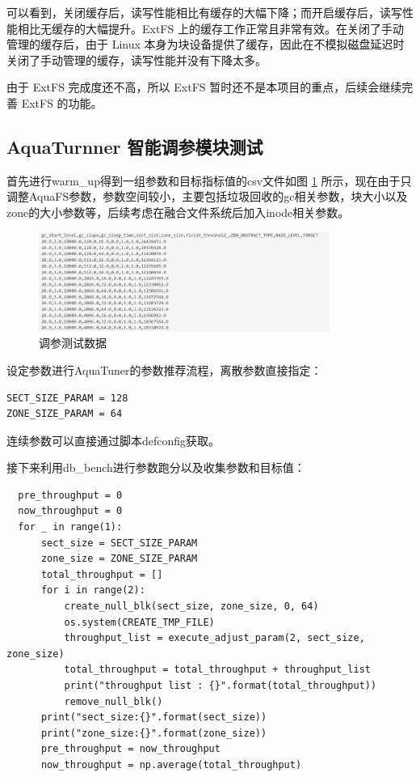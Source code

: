 可以看到，关闭缓存后，读写性能相比有缓存的大幅下降；而开启缓存后，读写性能相比无缓存的大幅提升。ExtFS 上的缓存工作正常且非常有效。在关闭了手动管理的缓存后，由于 Linux 本身为块设备提供了缓存，因此在不模拟磁盘延迟时关闭了手动管理的缓存，读写性能并没有下降太多。

由于 ExtFS 完成度还不高，所以 ExtFS 暂时还不是本项目的重点，后续会继续完善 ExtFS 的功能。

\subsection{AquaTurnner 智能调参模块测试}

首先进行warm\_up得到一组参数和目标指标值的csv文件如图 \ref{test-turnner1} 所示，现在由于只调整AquaFS参数，参数空间较小，主要包括垃圾回收的gc相关参数，块大小以及zone的大小参数等，后续考虑在融合文件系统后加入inode相关参数。

\begin{figure}[htbp]
  \centering
  \includegraphics[width=0.85\textwidth]{fig/turnner1}
  \caption{ 调参测试数据 }
  \label{test-turnner1}
\end{figure}

设定参数进行AquaTuner的参数推荐流程，离散参数直接指定：

\begin{lstlisting}
SECT_SIZE_PARAM = 128
ZONE_SIZE_PARAM = 64
\end{lstlisting}

连续参数可以直接通过脚本defconfig获取。

接下来利用db\_bench进行参数跑分以及收集参数和目标值：

\begin{lstlisting}
  pre_throughput = 0
  now_throughput = 0
  for _ in range(1):
      sect_size = SECT_SIZE_PARAM
      zone_size = ZONE_SIZE_PARAM
      total_throughput = []
      for i in range(2):
          create_null_blk(sect_size, zone_size, 0, 64)
          os.system(CREATE_TMP_FILE)
          throughput_list = execute_adjust_param(2, sect_size, zone_size)
          total_throughput = total_throughput + throughput_list
          print("throughput list : {}".format(total_throughput))
          remove_null_blk()
      print("sect_size:{}".format(sect_size))
      print("zone_size:{}".format(zone_size))
      pre_throughput = now_throughput
      now_throughput = np.average(total_throughput)
\end{lstlisting}

